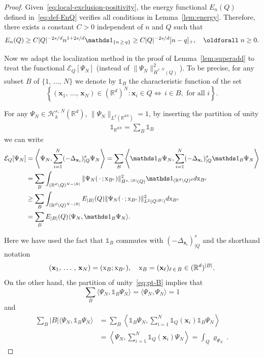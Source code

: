 \documentclass[10pt]{amsart}
\theoremstyle{definition}\newtheorem{defi}[theo]{Definition}\newtheorem{rema}[theo]{Remark}\newtheorem{exam}[theo]{Example}\newtheorem{exem}[theo]{Example}\newtheorem{nota}[theo]{Notation}
\newcommand*\R {\mathbb{R}}
\newcommand\1{{\ensuremath {\mathds 1} }}
\newcommand{\bx}{\mathbf{x}}
\newcommand{\cH}{\mathcal{H}}
\newcommand{\sx}{\textup{x}}
\newcommand{\cE}{\mathcal{E}}
\renewcommand*{\forall}{\mathrel{\oldforall}}
\begin{document}
\begin{proof}
Given~\eqref{eq:local-exclusion-positivity},
the energy functional $E_{n}(Q)$ defined in~\eqref{eq:def-EnQ} verifies all conditions in Lemma~\ref{lem:energy}. Therefore, there exists a constant $C>0$ independent of $n$ and $Q$ such that
\begin{equation}\label{eq:EnQ-lower-bound}
E_n(Q) \ge C |Q|^{-2s/d} n^{1+2s/d} \1_{\{n\,\ge\,q\}} \ge C |Q|^{-2s/d} [n-q]_+, \quad \forall n\ge 0.
\end{equation}

Now we adapt the localization method in the proof of Lemma~\ref{lem:superadd} to treat the functional $\cE_Q[\Psi_N]$ (instead of $\|\Psi_N\|_{\dot H^{s,\,N}(Q)}^2$). To be precise, for any subset $B$ of $\{1,\,\ldots,\,N\}$ we denote by $\1_B$ the characteristic function of the set
\[
\left\{ (\bx_1,\,\dots,\,\bx_N) \in (\R^d)^N : \bx_i\in Q \Leftrightarrow\, i \in B, \text{ for all } i\right\}.
\]

For any $\Psi_N\in \cH^{s,\,N}_k(\R^d)$, $\|\Psi_N\|_{L^2(\R^{dN})}=1$, by inserting the partition of unity
\begin{align}\label{eq:pt-B}
\1_{\R^{dN}} = \sum_{B} \1_B
\end{align}
we can write
\begin{equation}\label{eq:local-EQ-lowerbound}
\begin{aligned}
\cE_Q[\Psi_N] &=\left\langle \Psi_N, \sum_{i=1}^N (-\Delta_{\bx_i})^s_{|Q} \Psi_N \right\rangle =
\sum_{B} \left\langle \1_B \Psi_N, \sum_{i=1}^N (-\Delta_{\bx_i})^s_{|Q} \1_{B} \Psi_N \right\rangle\\
&=
\sum_{B} \int_{(\R^{d}\setminus Q)^{N-|B|}} \|\Psi_N(\,\cdot\,;\sx_{B^c})\|^2_{\dot H^{s,\,|B|}(Q)} \1_{(\R^d\setminus Q)^d}d \sx_{B^c}\\
&\ge
\sum_{B} \int_{(\R^{d}\setminus Q)^{N-|B|}} E_{|B|}(Q)\|\Psi_N(\,\cdot\,;\sx_{B^c})\|^2_{L^2(Q^{|B|})} d \sx_{B^c}\\
&=
\sum_{B} E_{|B|}(Q) \langle \Psi_N, \1_B \Psi_N\rangle.
\end{aligned}
\end{equation}


Here we have used the fact that $\1_B$ commutes with $(-\Delta_{\bx_i})^s_{|Q}$ and the shorthand notation
\[
(\bx_1,\,\ldots\,,\,\bx_N)=(\sx_{B};\sx_{B^c}), \quad \sx_{B}= (\bx_\ell)_{\ell\,\in\,B} \in (\R^{d})^{ |B|}.
\]
On the other hand, the partition of unity~\eqref{eq:pt-B} implies that
\[
\sum_{B} \langle \Psi_N, \1_B \Psi_N\rangle = \langle \Psi_N, \Psi_N\rangle =1
\]
and
\begin{align*}
\sum_{B} |B| \langle \Psi_N, \1_B \Psi_N\rangle
&= \sum_{B} \left \langle \1_B \Psi_N, \sum_{i=1}^N \1_Q(\bx_i) \1_B \Psi_N \right \rangle\\
&= \left \langle \Psi_N, \sum_{i=1}^N \1_Q(\bx_i) \Psi_N \right \rangle= \int_Q \varrho_{\Psi_N}\,.
\end{align*}



\end{proof}
\end{document}
